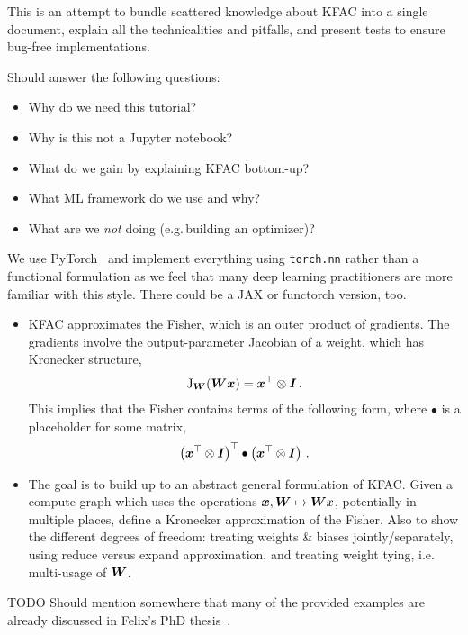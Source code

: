 This is an attempt to bundle scattered knowledge about KFAC into a single document, explain all the technicalities and pitfalls, and present tests to ensure bug-free implementations.

Should answer the following questions:
\begin{itemize}
\item Why do we need this tutorial?
\item Why is this not a Jupyter notebook?
\item What do we gain by explaining KFAC bottom-up?
\item What ML framework do we use and why?
\item What are we \emph{not} doing (e.g.\,building an optimizer)?
\end{itemize}

We use PyTorch~\cite{paszke2019pytorch} and implement everything using \texttt{torch.nn} rather than a functional formulation as we feel that many deep learning practitioners are more familiar with this style.
There could be a JAX or functorch version, too.

\begin{itemize}
\item KFAC approximates the Fisher, which is an outer product of gradients. The gradients involve the output-parameter Jacobian of a weight, which has Kronecker structure,
  \begin{align}
    \mathrm{J}_{{\bm{W}}}({\bm{W}} {\bm{x}}) = {\bm{x}}^{\top} \otimes {\bm{I}}\,.
  \end{align}
  This implies that the Fisher contains terms of the following form, where $\bullet$ is a placeholder for some matrix,
  \begin{align}
    \left(
    {\bm{x}}^{\top}\otimes {\bm{I}}
    \right)^{\top}
    \bullet
    \left(
    {\bm{x}}^{\top}\otimes {\bm{I}}
    \right)\,.
  \end{align}

\item The goal is to build up to an abstract general formulation of KFAC.
  Given a compute graph which uses the operations ${\bm{x}}, {\bm{W}} \mapsto {\bm{W}} x$, potentially in multiple places, define a Kronecker approximation of the Fisher.
  Also to show the different degrees of freedom: treating weights \& biases jointly/separately, using reduce versus expand approximation, and treating weight tying, i.e.
  multi-usage of ${\bm{W}}$.

\end{itemize}
TODO Should mention somewhere that many of the provided examples are already discussed in Felix's PhD thesis~\cite{dangel2023backpropagation}.
